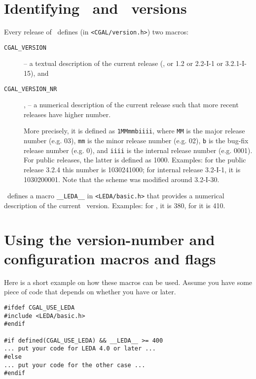 \section{Identifying \cgal\ and \leda\ versions}
\label{sec:which_versions}

Every release of \cgal\ defines (in \texttt{<CGAL/version.h>}) two
macros:
\begin{description}
\item[\texttt{CGAL\_VERSION}]
     -- a textual description of the
     current release (\eg, or 1.2 or 2.2-I-1 or 3.2.1-I-15), and 
\item[\texttt{CGAL\_VERSION\_NR}], 
     --  a numerical description of
     the current release such that more recent releases have higher
     number.

     More precisely, it is defined as \texttt{1MMmmbiiii},
     where \texttt{MM} is the major release number (e.g. 03),
     \texttt{mm} is the minor release number (e.g. 02),
     \texttt{b} is the bug-fix release number (e.g. 0), and
     \texttt{iiii} is the internal release number (e.g. 0001). For
     public releases, the latter is defined as 1000.
     Examples: for the public release 3.2.4 this number is 
     1030241000; for internal release 3.2-I-1, it is 1030200001.
     Note that the scheme was modified around 3.2-I-30.
\end{description}
 
\noindent \leda\ defines a macro \texttt{\_\_LEDA\_\_}
in
\texttt{<LEDA/basic.h>} that provides a numerical description of the
current \leda\ version. Examples: for , it is 380, for
 it is 410.

\section{Using the version-number and configuration macros and flags}
\label{sec:using_version_macros}

Here is a short example on how these macros can be used. Assume you have some
piece of code that depends on whether you have  or later.
\begin{verbatim}
#ifdef CGAL_USE_LEDA
#include <LEDA/basic.h>
#endif

#if defined(CGAL_USE_LEDA) && __LEDA__ >= 400
... put your code for LEDA 4.0 or later ...
#else
... put your code for the other case ...
#endif 
\end{verbatim}

